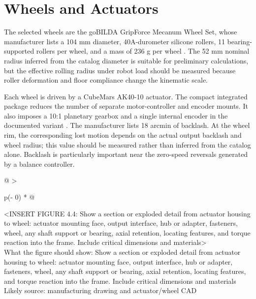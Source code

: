 \section{Wheels and Actuators}\label{wheels-and-actuators}

The selected wheels are the goBILDA GripForce Mecanum Wheel Set, whose
manufacturer lists a 104 mm diameter, 40A-durometer silicone rollers, 11
bearing-supported rollers per wheel, and a mass of 236 g per wheel
\cite{gobilda2026gripforce}. The 52 mm nominal radius inferred from the catalog diameter is
suitable for preliminary calculations, but the effective rolling radius
under robot load should be measured because roller deformation and floor
compliance change the kinematic scale.

Each wheel is driven by a CubeMars AK40-10 actuator. The compact
integrated package reduces the number of separate motor-controller and
encoder mounts. It also imposes a 10:1 planetary gearbox and a single
internal encoder in the documented variant \cite{cubemars2026ak4010}. The manufacturer
lists 18 arcmin of backlash. At the wheel rim, the corresponding lost
motion depends on the actual output backlash and wheel radius; this
value should be measured rather than inferred from the catalog alone.
Backlash is particularly important near the zero-speed reversals
generated by a balance controller.

\begin{longtable}[]{@{}
  >{\raggedright\arraybackslash}p{(\columnwidth - 0\tabcolsep) * }@{}}
\toprule\noalign{}
\begin{minipage}[b]{\linewidth}\raggedright
\textless INSERT FIGURE 4.4: Show a section or exploded detail from
actuator housing to wheel: actuator mounting face, output interface, hub
or adapter, fasteners, wheel, any shaft support or bearing, axial
retention, locating features, and torque reaction into the frame.
Include critical dimensions and materials\textgreater{}\\
What the figure should show: Show a section or exploded detail from
actuator housing to wheel: actuator mounting face, output interface, hub
or adapter, fasteners, wheel, any shaft support or bearing, axial
retention, locating features, and torque reaction into the frame.
Include critical dimensions and materials\\
Likely source: manufacturing drawing and actuator\slash{}wheel CAD\strut
\end{minipage} \\
\midrule\noalign{}
\endhead
\bottomrule\noalign{}
\endlastfoot
\end{longtable}

